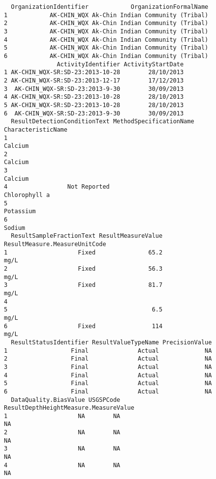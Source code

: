 \documentclass[
  12pt,
]{article}
\begin{document}
\begin{verbatim}
  OrganizationIdentifier            OrganizationFormalName
1            AK-CHIN_WQX Ak-Chin Indian Community (Tribal)
2            AK-CHIN_WQX Ak-Chin Indian Community (Tribal)
3            AK-CHIN_WQX Ak-Chin Indian Community (Tribal)
4            AK-CHIN_WQX Ak-Chin Indian Community (Tribal)
5            AK-CHIN_WQX Ak-Chin Indian Community (Tribal)
6            AK-CHIN_WQX Ak-Chin Indian Community (Tribal)
               ActivityIdentifier ActivityStartDate
1 AK-CHIN_WQX-SR:SD-23:2013-10-28        28/10/2013
2 AK-CHIN_WQX-SR:SD-23:2013-12-17        17/12/2013
3  AK-CHIN_WQX-SR:SD-23:2013-9-30        30/09/2013
4 AK-CHIN_WQX-SR:SD-23:2013-10-28        28/10/2013
5 AK-CHIN_WQX-SR:SD-23:2013-10-28        28/10/2013
6  AK-CHIN_WQX-SR:SD-23:2013-9-30        30/09/2013
  ResultDetectionConditionText MethodSpecificationName CharacteristicName
1                                                                 Calcium
2                                                                 Calcium
3                                                                 Calcium
4                 Not Reported                              Chlorophyll a
5                                                               Potassium
6                                                                  Sodium
  ResultSampleFractionText ResultMeasureValue ResultMeasure.MeasureUnitCode
1                    Fixed               65.2                          mg/L
2                    Fixed               56.3                          mg/L
3                    Fixed               81.7                          mg/L
4                                                                          
5                                         6.5                          mg/L
6                    Fixed                114                          mg/L
  ResultStatusIdentifier ResultValueTypeName PrecisionValue
1                  Final              Actual             NA
2                  Final              Actual             NA
3                  Final              Actual             NA
4                  Final              Actual             NA
5                  Final              Actual             NA
6                  Final              Actual             NA
  DataQuality.BiasValue USGSPCode ResultDepthHeightMeasure.MeasureValue
1                    NA        NA                                    NA
2                    NA        NA                                    NA
3                    NA        NA                                    NA
4                    NA        NA                                    NA

\end{verbatim}
\end{document}
